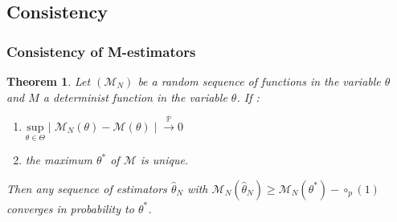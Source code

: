 \documentclass[11pt, a4paper]{article}
\newtheorem{theorem}{Theorem}
\begin{document}
\subsection{Consistency}
\subsubsection{Consistency of M-estimators}
\begin{theorem} \label{ThMest} \cite{vaart_1998}
Let $(\mathcal{M}_N)$ be a random sequence of functions in the variable $\theta$ and $M$ a determinist function in the variable $\theta$. If :
\begin{enumerate}
\item $\underset{\theta \in \Theta}{\mathrm{sup}} \mid \mathcal{M}_N(\theta)-\mathcal{M}(\theta) \mid \overset{\mathbb{P}}{\longrightarrow} 0$
\item the maximum $\theta^\ast$ of $\mathcal{M}$ is unique.
\end{enumerate}
Then any sequence of estimators $\widehat{\theta}_N$ with $\mathcal{M}_N(\widehat{\theta}_N) \geq \mathcal{M}_N(\theta^\ast)-\circ_p(1)$ converges in probability to $\theta^\ast$.
\end{theorem}
\end{document}
